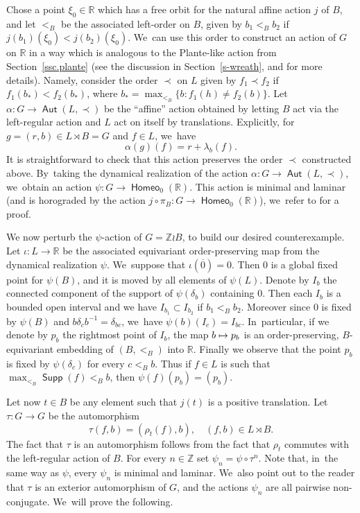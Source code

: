 \documentclass[JEP,XML,SOM,Unicode,NoFloatCountersInSection,published]{cedram}
\def\mto{\mathchoice{\longmapsto}{\mapsto}{\mapsto}{\mapsto}}
\theoremstyle{definition}
\DeclareMathOperator{\Aut}{\mathsf{Aut}}
\DeclareMathOperator{\homeo}{\mathsf{Homeo}}
\DeclareMathOperator{\supp}{\mathsf{Supp}}
\newcommand{\R}{\mathbb{R}}
\newcommand{\Z}{\mathbb Z}
\begin{document}
Chose a point $\xi_0\in \R$ which has a free orbit for the natural affine action $j$ of $B$, and let $<_B$ be the associated left-order on $B$, given by $b_1<_Bb_2$ if $j(b_1)(\xi_0)<j(b_2)(\xi_0)$. We~can use this order to construct an action of $G$ on $\R$ in a way which is analogous to the Plante-like action from Section~\ref{ssc.plante} (see the discussion in Section~\ref{s-wreath}, and \cite[Ex.\,8.1.8]{BMRT} for more details). Namely, consider the order $\prec$ on $L$ given by $f_1\prec f_2$ if $f_1(b_*)<f_2(b_*)$, where $b_*=\max_{<_B} \{b : f_1(h)\neq f_2(b)\}$. Let $\alpha \colon G\to \Aut(L, \prec)$ be the ``affine'' action obtained by letting $B$ act via the left-regular action and $L$ act on itself by translations. Explicitly, for $g=(r, b)\in L\rtimes B=G$ and $ f\in L$, we~have
\[\alpha(g)(f)=r+\lambda_b(f).
\]
It is straightforward to check that this action preserves the order $\prec$ constructed above. By~taking the dynamical realization of the action $\alpha \colon G\to \Aut (L, \prec)$, we~obtain an action
$\psi\colon G\to \homeo_0(\R)$. This action is minimal and laminar (and is horograded by the action $j\circ \pi_B\colon G\to \homeo_0(\R)$), we~refer to \cite[Ex.\,8.1.8]{BMRT} for a proof.

We now perturb the $\psi$-action of $G=\Z\wr B$, to build our desired counterexample. Let $\iota \colon L\to \R$ be the associated equivariant order-preserving map from the dynamical realization $\psi$. We~suppose that $\iota(\overline{0})=0$. Then $0$ is a global fixed point for $\psi(B)$, and it is moved by all elements of $\psi(L)$. Denote by $I_b$ the connected component of the support of $\psi(\delta_b)$ containing 0. Then each $I_{b}$ is a bounded open interval and we have $I_{b_1}\subset I_{b_2}$ if $b_1<_B b_2$. Moreover since $0$ is fixed by $\psi(B)$ and $b\delta_cb^{-1}=\delta_{bc}$, we~have $\psi(b)(I_c)=I_{bc}$. In~particular, if we denote by $p_b$ the rightmost point of $I_b$, the map $b\mto p_b$ is an order-preserving, $B$-equivariant embedding of $(B,<_B)$ into $\R$. Finally we observe that the point $p_b$ is fixed by $\psi(\delta_c)$ for every $c<_B b$. Thus if $f\in L$ is such that $\max_{<_B} \supp (f)<_B b$, then $\psi(f)(p_b)=(p_b)$.

Let now $t\in B$ be any element such that $j(t)$ is a positive translation. Let $\tau\colon G\to G$ be the automorphism
\[\tau(f, b)=(\rho_t(f), b), \quad (f, b)\in L \rtimes B.
\]
The fact that $\tau$ is an automorphism follows from the fact that $\rho_t$ commutes with the left-regular action of $B$. For every $n\in \Z$ set $\psi_n=\psi \circ \tau^n$. Note that, in~the same way as $\psi$, every $\psi_n$ is minimal and laminar. We~also point out to the reader that $\tau$ is an exterior automorphism of $G$, and the actions $\psi_n$ are all pairwise non-conjugate. We~will prove the following.
\end{document}
